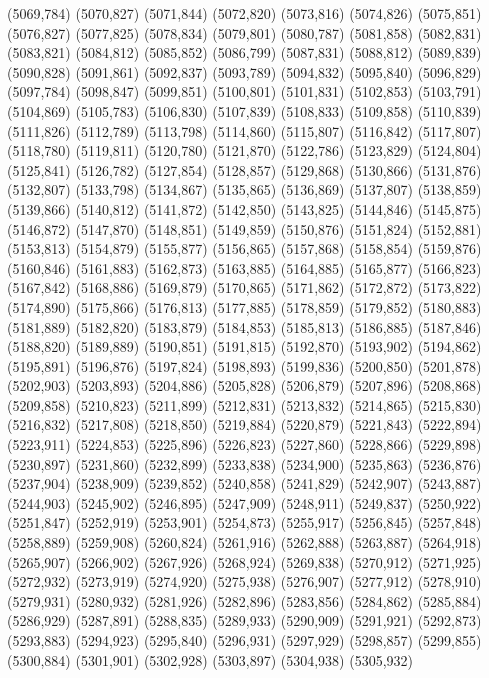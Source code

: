 (5069,784)
(5070,827)
(5071,844)
(5072,820)
(5073,816)
(5074,826)
(5075,851)
(5076,827)
(5077,825)
(5078,834)
(5079,801)
(5080,787)
(5081,858)
(5082,831)
(5083,821)
(5084,812)
(5085,852)
(5086,799)
(5087,831)
(5088,812)
(5089,839)
(5090,828)
(5091,861)
(5092,837)
(5093,789)
(5094,832)
(5095,840)
(5096,829)
(5097,784)
(5098,847)
(5099,851)
(5100,801)
(5101,831)
(5102,853)
(5103,791)
(5104,869)
(5105,783)
(5106,830)
(5107,839)
(5108,833)
(5109,858)
(5110,839)
(5111,826)
(5112,789)
(5113,798)
(5114,860)
(5115,807)
(5116,842)
(5117,807)
(5118,780)
(5119,811)
(5120,780)
(5121,870)
(5122,786)
(5123,829)
(5124,804)
(5125,841)
(5126,782)
(5127,854)
(5128,857)
(5129,868)
(5130,866)
(5131,876)
(5132,807)
(5133,798)
(5134,867)
(5135,865)
(5136,869)
(5137,807)
(5138,859)
(5139,866)
(5140,812)
(5141,872)
(5142,850)
(5143,825)
(5144,846)
(5145,875)
(5146,872)
(5147,870)
(5148,851)
(5149,859)
(5150,876)
(5151,824)
(5152,881)
(5153,813)
(5154,879)
(5155,877)
(5156,865)
(5157,868)
(5158,854)
(5159,876)
(5160,846)
(5161,883)
(5162,873)
(5163,885)
(5164,885)
(5165,877)
(5166,823)
(5167,842)
(5168,886)
(5169,879)
(5170,865)
(5171,862)
(5172,872)
(5173,822)
(5174,890)
(5175,866)
(5176,813)
(5177,885)
(5178,859)
(5179,852)
(5180,883)
(5181,889)
(5182,820)
(5183,879)
(5184,853)
(5185,813)
(5186,885)
(5187,846)
(5188,820)
(5189,889)
(5190,851)
(5191,815)
(5192,870)
(5193,902)
(5194,862)
(5195,891)
(5196,876)
(5197,824)
(5198,893)
(5199,836)
(5200,850)
(5201,878)
(5202,903)
(5203,893)
(5204,886)
(5205,828)
(5206,879)
(5207,896)
(5208,868)
(5209,858)
(5210,823)
(5211,899)
(5212,831)
(5213,832)
(5214,865)
(5215,830)
(5216,832)
(5217,808)
(5218,850)
(5219,884)
(5220,879)
(5221,843)
(5222,894)
(5223,911)
(5224,853)
(5225,896)
(5226,823)
(5227,860)
(5228,866)
(5229,898)
(5230,897)
(5231,860)
(5232,899)
(5233,838)
(5234,900)
(5235,863)
(5236,876)
(5237,904)
(5238,909)
(5239,852)
(5240,858)
(5241,829)
(5242,907)
(5243,887)
(5244,903)
(5245,902)
(5246,895)
(5247,909)
(5248,911)
(5249,837)
(5250,922)
(5251,847)
(5252,919)
(5253,901)
(5254,873)
(5255,917)
(5256,845)
(5257,848)
(5258,889)
(5259,908)
(5260,824)
(5261,916)
(5262,888)
(5263,887)
(5264,918)
(5265,907)
(5266,902)
(5267,926)
(5268,924)
(5269,838)
(5270,912)
(5271,925)
(5272,932)
(5273,919)
(5274,920)
(5275,938)
(5276,907)
(5277,912)
(5278,910)
(5279,931)
(5280,932)
(5281,926)
(5282,896)
(5283,856)
(5284,862)
(5285,884)
(5286,929)
(5287,891)
(5288,835)
(5289,933)
(5290,909)
(5291,921)
(5292,873)
(5293,883)
(5294,923)
(5295,840)
(5296,931)
(5297,929)
(5298,857)
(5299,855)
(5300,884)
(5301,901)
(5302,928)
(5303,897)
(5304,938)
(5305,932)
